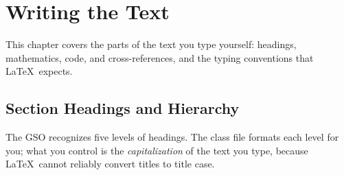 %

\chapter{Writing the Text}
\label{ch:writing}

This chapter covers the parts of the text you type yourself: headings, mathematics, code, and cross-references, and the typing conventions that \LaTeX\ expects.

\section{Section Headings and Hierarchy}
\label{sec:headings}

The GSO recognizes five levels of headings. The class file formats each level for you; what you control is the \emph{capitalization} of the text you type, because \LaTeX\ cannot reliably convert titles to title case.

